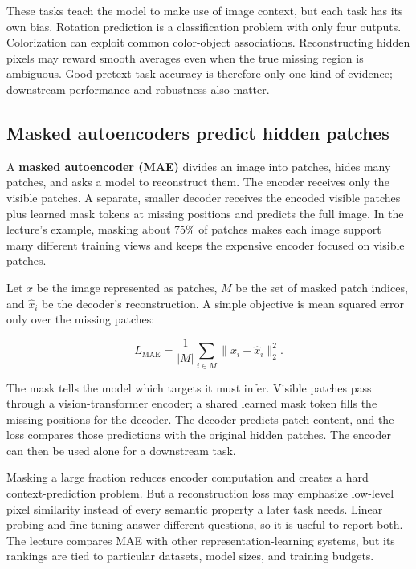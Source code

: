 These tasks teach the model to make use of image context, but each task has its own bias. Rotation prediction is a classification problem with only four outputs. Colorization can exploit common color-object associations. Reconstructing hidden pixels may reward smooth averages even when the true missing region is ambiguous. Good pretext-task accuracy is therefore only one kind of evidence; downstream performance and robustness also matter.

\subsection{Masked autoencoders predict hidden patches}\label{04-visual-computing-ii-ch031-masked-autoencoders-predict-hidden-patches}

\hypertarget{04-visual-computing-ii-ch031-masked-autoencoders-predict-hidden-patches}{}

A \textbf{masked autoencoder (MAE)} divides an image into patches, hides many patches, and asks a model to reconstruct them. The encoder receives only the visible patches. A separate, smaller decoder receives the encoded visible patches plus learned mask tokens at missing positions and predicts the full image. In the lecture's example, masking about 75\% of patches makes each image support many different training views and keeps the expensive encoder focused on visible patches.

Let \(x\) be the image represented as patches, \(M\) be the set of masked patch indices, and \(\hat{x}_i\) be the decoder's reconstruction. A simple objective is mean squared error only over the missing patches:

\[
L_{\text{MAE}}=\frac{1}{|M|}\sum_{i\in M}\|x_i-\hat{x}_i\|_2^2.
\]

The mask tells the model which targets it must infer. Visible patches pass through a vision-transformer encoder; a shared learned mask token fills the missing positions for the decoder. The decoder predicts patch content, and the loss compares those predictions with the original hidden patches. The encoder can then be used alone for a downstream task.

Masking a large fraction reduces encoder computation and creates a hard context-prediction problem. But a reconstruction loss may emphasize low-level pixel similarity instead of every semantic property a later task needs. Linear probing and fine-tuning answer different questions, so it is useful to report both. The lecture compares MAE with other representation-learning systems, but its rankings are tied to particular datasets, model sizes, and training budgets.

